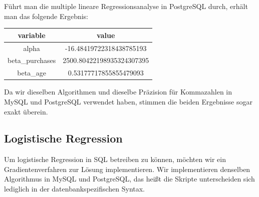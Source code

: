 Führt man die multiple lineare Regressionsanalyse in PostgreSQL durch, erhält man das folgende Ergebnis:

\begin{center}
  \begin{tabular}{|c|c|}\hline
    \textbf{variable} & \textbf{value} \\ \hline
    alpha & -16.48419722318438785193 \\ \hline
    beta\_purchases & 2500.80422198935324307395 \\ \hline
    beta\_age & 0.53177717855855479093 \\ \hline
  \end{tabular}
\end{center}

Da wir dieselben Algorithmen und dieselbe Präzision für Kommazahlen in MySQL und PostgreSQL verwendet haben, stimmen die beiden Ergebnisse sogar exakt überein.

\subsection{Logistische Regression}

Um logistische Regression in SQL betreiben zu können, möchten wir ein Gradientenverfahren zur Lösung implementieren. Wir implementieren denselben Algorithmus in MySQL und PostgreSQL, das heißt die Skripte unterscheiden sich lediglich in der datenbankspezifischen Syntax.

